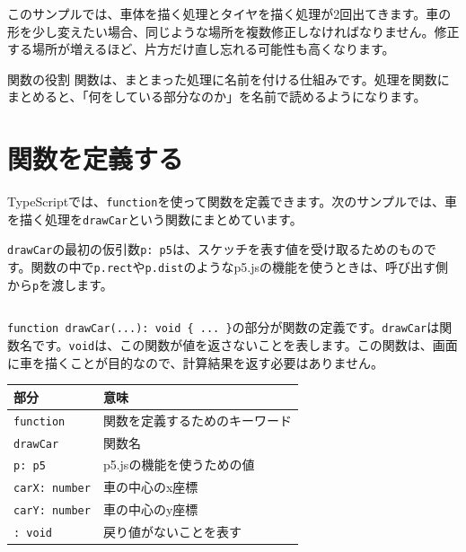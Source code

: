 このサンプルでは、車体を描く処理とタイヤを描く処理が2回出てきます。車の形を少し変えたい場合、同じような場所を複数修正しなければなりません。修正する場所が増えるほど、片方だけ直し忘れる可能性も高くなります。

\begin{pointbox}{関数の役割}
関数は、まとまった処理に名前を付ける仕組みです。処理を関数にまとめると、「何をしている部分なのか」を名前で読めるようになります。
\end{pointbox}

\section{関数を定義する}

TypeScriptでは、\texttt{function}を使って関数を定義できます。次のサンプルでは、車を描く処理を\texttt{drawCar}という関数にまとめています。

\texttt{drawCar}の最初の仮引数\texttt{p: p5}は、スケッチを表す値を受け取るためのものです。関数の中で\texttt{p.rect}や\texttt{p.dist}のようなp5.jsの機能を使うときは、呼び出す側から\texttt{p}を渡します。

\begin{listing}[htbp]
\inputminted{ts}{typescript-p5/listings/chapter08/draw-car-function.ts}
\caption{車を描く処理を関数にまとめる（\texttt{chapter08/draw-car-function.ts}）}
\label{lst:chapter08-draw-car-function}
\end{listing}

\texttt{function drawCar(...): void \{ ... \}}の部分が関数の定義です。\texttt{drawCar}は関数名です。\texttt{void}は、この関数が値を返さないことを表します。この関数は、画面に車を描くことが目的なので、計算結果を返す必要はありません。

{\footnotesize
\begin{center}
\begin{tabular}{ll}
\toprule
部分 & 意味 \\
\midrule
\texttt{function} & 関数を定義するためのキーワード \\
\texttt{drawCar} & 関数名 \\
\texttt{p: p5} & p5.jsの機能を使うための値 \\
\texttt{carX: number} & 車の中心のx座標 \\
\texttt{carY: number} & 車の中心のy座標 \\
\texttt{: void} & 戻り値がないことを表す \\
\bottomrule
\end{tabular}
\end{center}
}

